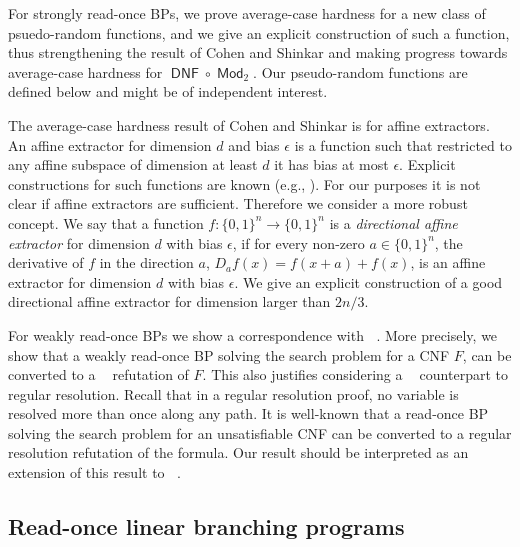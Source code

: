 \documentclass[a4paper,11pt,draft]{article}
\theoremstyle{definition}
\theoremstyle{remark}
\DeclareMathOperator{\dnf}{\mathsf{DNF}}
\DeclareMathOperator{\Mod}{\mathsf{Mod}}
\DeclareMathOperator{\reslin}{\mathsf{Res}[\oplus]}
\newcommand{\Q}{{\{0,1\}}}
\newcommand{\sreadonce}{strongly read-once}
\newcommand{\wreadonce}{weakly read-once}
\newcommand{\Readonce}{Read-once}
\begin{document}
%

%

For \sreadonce{} BPs, we prove average-case hardness for a new class of psuedo-random functions, and we give an explicit construction of such a function, thus strengthening the result of Cohen and Shinkar \cite{DBLP:conf/innovations/CohenS16} and making progress towards average-case hardness for $\dnf \circ \Mod_2$. Our pseudo-random functions are defined below and might be of independent interest.

\bigskip
{} The average-case hardness result of Cohen and Shinkar \cite{DBLP:conf/innovations/CohenS16} is for affine extractors. An affine extractor for dimension $d$ and bias $\epsilon$ is a function such that restricted to any affine subspace of dimension at least $d$ it has bias at most $\epsilon$. Explicit constructions for such functions are known (e.g., \cite{MR2306652,DBLP:journals/combinatorica/Yehudayoff11,DBLP:journals/siamcomp/Ben-SassonK12}). For our purposes it is not clear if affine extractors are sufficient. Therefore we consider a more robust concept. We say that a function $f\colon \Q^n \rightarrow \Q^n$ is a \emph{directional affine extractor} for dimension $d$ with bias $\epsilon$, if for every non-zero $a \in \Q^n$, the derivative of $f$ in the direction $a$, $D_a f(x) = f(x+a) + f(x)$, is an affine extractor for dimension $d$ with bias $\epsilon$. We give an explicit construction of a good directional affine extractor for dimension larger than $2n/3$.



For \wreadonce{} BPs we show a correspondence with $\reslin$. More precisely, we show that a \wreadonce{} BP solving the search problem for a CNF $F$, can be converted to a $\reslin$ refutation of $F$. This also justifies considering a $\reslin$ counterpart to regular resolution. Recall that in a regular resolution proof, no variable is resolved more than once along any path. It is well-known that a read-once BP solving the search problem for an unsatisfiable CNF can be converted to a regular resolution refutation of the formula. Our result should be interpreted as an extension of this result to $\reslin$.



%

%
%
%
%





\subsection{\Readonce{} linear branching programs}
\end{document}
